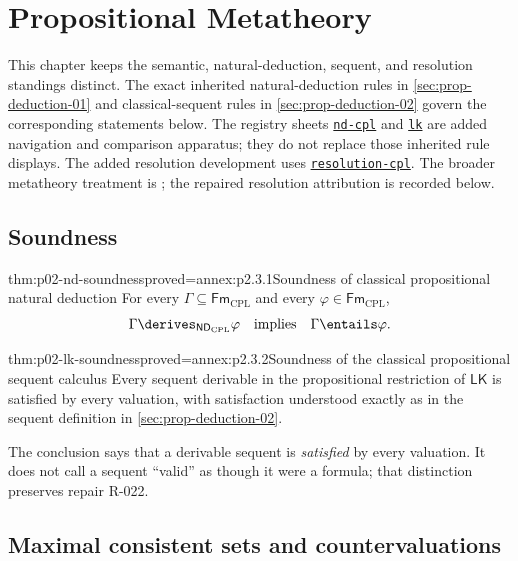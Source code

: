 \chapter{Propositional Metatheory}
\label{sec:p02-propositional-metatheory}

This chapter keeps the semantic, natural-deduction, sequent, and resolution
standings distinct.  The exact inherited natural-deduction rules in
\cref{sec:prop-deduction-01} and classical-sequent rules in
\cref{sec:prop-deduction-02} govern the corresponding statements below.  The
registry sheets \hyperref[sheet:nd-cpl]{\texttt{nd-cpl}} and
\hyperref[sheet:lk]{\texttt{lk}} are added navigation and comparison
apparatus; they do not replace those inherited rule displays.  The added
resolution development uses
\hyperref[sheet:resolution-cpl]{\texttt{resolution-cpl}}.  The broader
metatheory treatment is \cite{EbbinghausFlumThomas1994,OpenLogic2026}; the
repaired resolution attribution is recorded below.

\section{Soundness}
\label{sec:p02-prop-soundness}

\begin{hbtheorem}{thm:p02-nd-soundness}{proved=annex:p2.3.1}{Soundness of classical propositional natural deduction}
For every \(\Gamma\subseteq\mathsf{Fm}_{\mathrm{CPL}}\) and every
\(\varphi\in\mathsf{Fm}_{\mathrm{CPL}}\),
\[
 \Gamma\derives_{\mathsf{ND}_{\mathrm{CPL}}}\varphi
 \quad\text{implies}\quad
 \Gamma\entails\varphi.
\]
\end{hbtheorem}

\begin{hbtheorem}{thm:p02-lk-soundness}{proved=annex:p2.3.2}{Soundness of the classical propositional sequent calculus}
Every sequent derivable in the propositional restriction of
\(\mathsf{LK}\) is satisfied by every valuation, with satisfaction understood
exactly as in the sequent definition in \cref{sec:prop-deduction-02}.
\end{hbtheorem}

The conclusion says that a derivable sequent is \emph{satisfied} by every
valuation.  It does not call a sequent ``valid'' as though it were a formula;
that distinction preserves repair R-022.

\section{Maximal consistent sets and countervaluations}
\label{sec:p02-prop-maximal-consistency}

